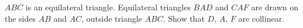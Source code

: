 $ABC$ is an equilateral triangle. Equilateral triangles $BAD$ and $CAF$ are drawn on the sides $AB$ and $AC$, outside triangle $ABC$. Show that $D$, $A$, $F$ are collinear.
